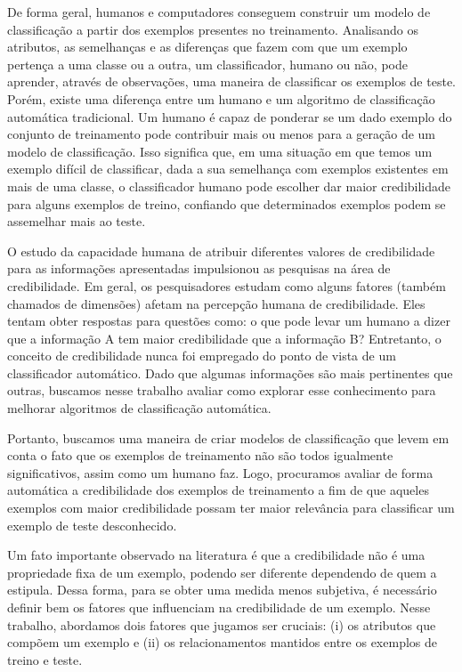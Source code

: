 De forma geral, humanos e computadores conseguem construir um modelo de classificação a partir dos exemplos presentes no treinamento. 
Analisando os atributos, as semelhanças e as diferenças que fazem com que um exemplo pertença a uma classe ou a outra, um classificador, humano ou não, pode aprender, através de observações, uma maneira de classificar os exemplos de teste.
Porém, existe uma diferença entre um humano e um algoritmo de classificação automática tradicional. 
Um humano é capaz de ponderar se um dado exemplo do conjunto de treinamento pode contribuir mais ou menos para a geração de um modelo de classificação.
Isso significa que, em uma situação em que temos um exemplo difícil de classificar, dada a sua semelhança com exemplos existentes em mais de uma classe, o classificador humano pode escolher dar maior credibilidade para alguns exemplos de treino, confiando que determinados exemplos podem se assemelhar mais ao teste.

O estudo da capacidade humana de atribuir diferentes valores de credibilidade para as informações apresentadas impulsionou as pesquisas na área de credibilidade. 
Em geral, os pesquisadores estudam como alguns fatores (também chamados de dimensões) afetam na percepção humana de credibilidade.
Eles tentam obter respostas para questões como: o que pode levar um humano a dizer que a informação A tem maior credibilidade que a informação B?
Entretanto, o conceito de credibilidade nunca foi empregado do ponto de vista de um classificador automático. Dado que algumas informações são mais pertinentes que outras, buscamos nesse trabalho avaliar como explorar esse conhecimento para melhorar algoritmos de classificação automática.

Portanto, buscamos uma maneira de criar modelos de classificação que levem em conta o fato que os exemplos de treinamento não são todos igualmente significativos, assim como um humano faz.
Logo, procuramos avaliar de forma automática a credibilidade dos exemplos de treinamento a fim de que aqueles exemplos com maior credibilidade possam ter maior relevância para classificar um exemplo de teste desconhecido.

Um fato importante observado na literatura é que a credibilidade não é uma propriedade fixa de um exemplo, podendo ser diferente dependendo de quem a estipula. Dessa forma, para se obter uma medida menos subjetiva, é necessário definir bem os fatores que influenciam na credibilidade de um exemplo. Nesse trabalho, abordamos dois fatores que jugamos ser cruciais: (i) os atributos que compõem um exemplo e (ii) os relacionamentos mantidos entre os exemplos de treino e teste.

